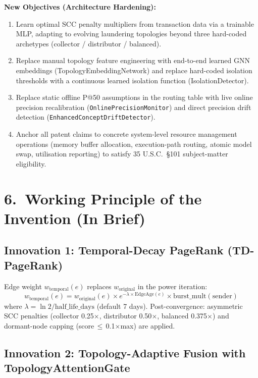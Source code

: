 \documentclass[12pt,a4paper]{article}
\begin{document}
\textbf{New Objectives (Architecture Hardening):}
\begin{enumerate}[leftmargin=*,noitemsep,start=6]
  \item Learn optimal SCC penalty multipliers from transaction data via a trainable MLP,
        adapting to evolving laundering topologies beyond three hard-coded archetypes
        (collector / distributor / balanced).
  \item Replace manual topology feature engineering with end-to-end learned GNN embeddings
        (TopologyEmbeddingNetwork) and replace hard-coded isolation thresholds with a
        continuous learned isolation function (IsolationDetector).
  \item Replace static offline P@50 assumptions in the routing table with live online
        precision recalibration (\texttt{OnlinePrecisionMonitor}) and direct precision drift
        detection (\texttt{EnhancedConceptDriftDetector}).
  \item Anchor all patent claims to concrete system-level resource management operations
        (memory buffer allocation, execution-path routing, atomic model swap, utilisation
        reporting) to satisfy 35 U.S.C.\ \S101 subject-matter eligibility.
\end{enumerate}

\section{6.\ Working Principle of the Invention (In Brief)}

\subsection{Innovation 1: Temporal-Decay PageRank (TD-PageRank)}

Edge weight $w_\text{temporal}(e)$ replaces $w_\text{original}$ in the power iteration:
\[
  w_\text{temporal}(e) = w_\text{original}(e)\times e^{-\lambda\times\text{EdgeAge}(e)}
                         \times \text{burst\_mult}(\text{sender})
\]
where $\lambda = \ln 2 / \text{half\_life\_days}$ (default 7 days). Post-convergence:
asymmetric SCC penalties (collector 0.25$\times$, distributor 0.50$\times$, balanced 0.375$\times$)
and dormant-node capping (score\,$\leq$\,0.1$\times$max) are applied.

\subsection{Innovation 2: Topology-Adaptive Fusion with TopologyAttentionGate}
\end{document}
